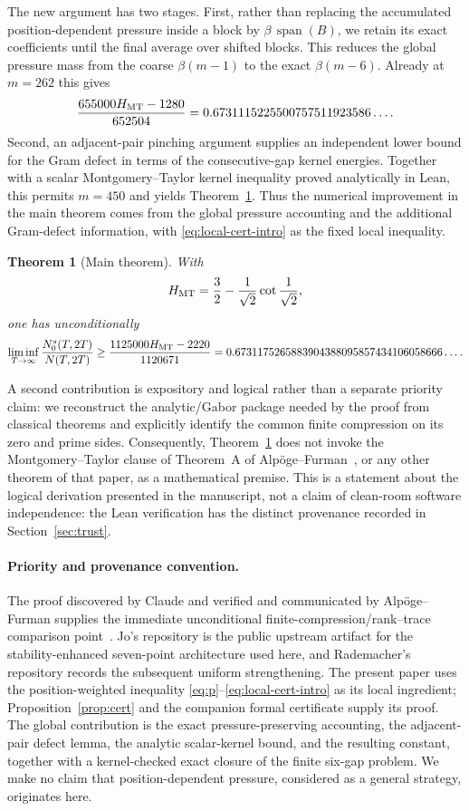 \documentclass[11pt]{article}
\newtheorem{theorem}{Theorem}[section]
\begin{document}
The new argument has two stages.  First, rather than replacing the accumulated
position-dependent pressure inside a block by
\(\beta\,\operatorname{span}(B)\), we retain its exact coefficients until the
final average over shifted blocks.  This reduces the global pressure mass from
the coarse \(\beta(m-1)\) to the exact \(\beta(m-6)\).  Already at \(m=262\)
this gives
\[
 \frac{655000H_{\rm MT}-1280}{652504}
 =
 0.6731115225500757511923586\ldots .
\]
Second, an adjacent-pair pinching argument supplies an independent lower bound
for the Gram defect in terms of the consecutive-gap kernel energies.  Together
with a scalar Montgomery--Taylor kernel inequality proved analytically in
Lean, this permits \(m=450\) and yields Theorem~\ref{thm:main}.  Thus the
numerical improvement in the main theorem comes from the global pressure
accounting and the additional Gram-defect information, with
\eqref{eq:local-cert-intro} as the fixed local inequality.

\begin{theorem}[Main theorem]\label{thm:main}
With
\[
 H_{\rm MT}
 =
 \frac32-\frac1{\sqrt2}\cot\frac1{\sqrt2},
\]
one has unconditionally
\[
 \liminf_{T\to\infty}
 \frac{N_0^s(T,2T)}{N(T,2T)}
 \ge
 \frac{1125000H_{\rm MT}-2220}{1120671}
 =
 0.6731175265883904388095857434106058666\ldots .
\]
\end{theorem}

A second contribution is expository and logical rather than a separate
priority claim: we reconstruct the analytic/Gabor package needed by the proof
from classical theorems and explicitly identify the common finite compression
on its zero and prime sides.  Consequently, Theorem~\ref{thm:main} does not
invoke the Montgomery--Taylor clause of Theorem~A of Alpöge--Furman~\cite{AlpogeFurman26}, or any other theorem
of that paper, as a mathematical premise.  This is a statement about the
logical derivation presented in the manuscript, not a claim of clean-room
software independence: the Lean verification has the distinct provenance
recorded in Section~\ref{sec:trust}.

\paragraph{Priority and provenance convention.}
The proof discovered by Claude and verified and communicated by
Alpöge--Furman supplies the immediate unconditional
finite-compression/rank--trace comparison point~\cite{AlpogeFurman26,Anthropic26}.
Jo's repository is the public upstream artifact for the stability-enhanced
seven-point architecture used here, and Rademacher's repository records the
subsequent uniform strengthening.  The present paper uses the
position-weighted inequality \eqref{eq:p}--\eqref{eq:local-cert-intro} as its
local ingredient; Proposition~\ref{prop:cert} and the companion formal
certificate supply its proof.  The global contribution is the exact
pressure-preserving accounting, the adjacent-pair defect lemma, the analytic
scalar-kernel bound, and the resulting constant, together with a
kernel-checked exact closure of the finite six-gap problem.  We make no claim that position-dependent pressure, considered as a
general strategy, originates here.
\end{document}
